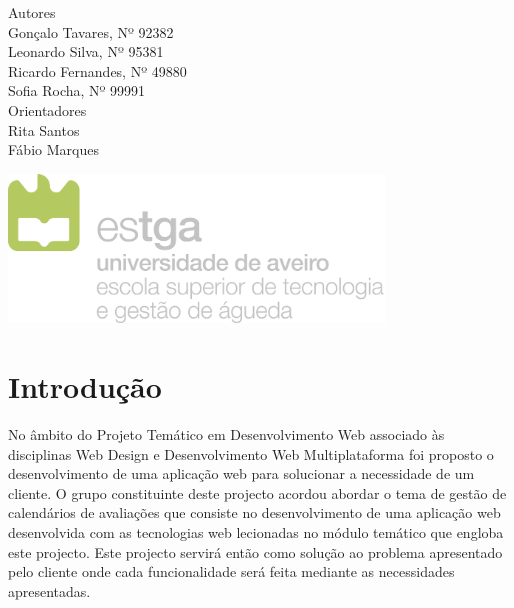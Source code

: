 \documentclass[11pt, twoside]{report}
\begin{document}
\begin{titlepage}
		
		
		\large
		Autores\\
		Gonçalo Tavares, Nº 92382  \\
		Leonardo Silva, Nº 95381 \\
		Ricardo Fernandes, Nº 49880  \\
		Sofia Rocha, Nº 99991 \\
		
		\vspace{1cm}
		Orientadores\\
		Rita Santos \\
		Fábio Marques\\
		\vspace{4cm}
		
		\centering
		\includegraphics[width=10cm]{image/AssB_vertical_cor}
		
	\end{titlepage}

	\newpage
	\setcounter{page}{1} %
	\tableofcontents %
	\thispagestyle{plain} %
	\thispagestyle{empty} %
	\newpage
	\listoftables %
	\newpage
	\listoffigures %
	
	\newpage
	\thispagestyle{plain}%
	\thispagestyle{empty}%
	
	
	\printnomenclature
	
	\newpage
	
	
	\chapter{Introdução}
	
	No âmbito do Projeto Temático em Desenvolvimento Web associado às disciplinas Web Design e Desenvolvimento Web Multiplataforma foi proposto o desenvolvimento de uma aplicação web para solucionar a necessidade de um cliente. 
	O grupo constituinte deste projecto acordou abordar o tema de gestão de calendários de avaliações que consiste no desenvolvimento de uma aplicação web desenvolvida com as tecnologias web lecionadas no módulo temático que engloba este projecto.
	Este projecto servirá então como solução ao problema apresentado pelo cliente onde cada funcionalidade será feita mediante as necessidades apresentadas.
	
\end{document}
